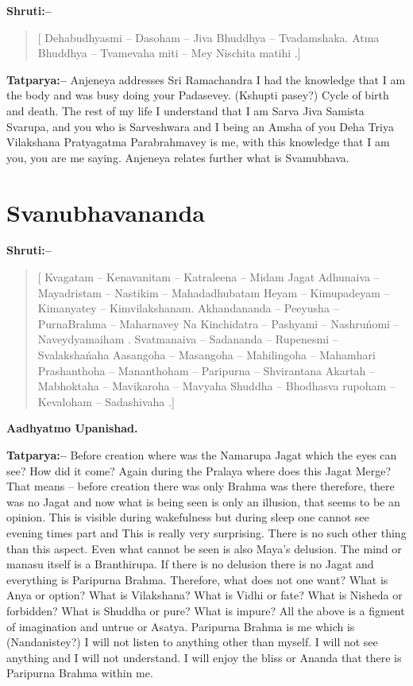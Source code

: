 \textbf{Shruti:–}

\begin{verse}
[ Dehabudhyasmi – Dasoham – Jiva Bhuddhya – Tvadamshaka.  Atma Bhuddhya – Tvamevaha miti – Mey Nischita matihi .]
\end{verse}

\textbf{Tatparya:–} Anjeneya addresses Sri Ramachandra I had the knowledge that I am the body and was busy doing your Padasevey. (Kshupti pasey?) Cycle of birth and death. The rest of my life I understand that I am Sarva Jiva Samista Svarupa, and you who is Sarveshwara and I being an Amsha of you Deha Triya Vilakshana Pratyagatma Parabrahmavey is me, with this knowledge that I am you, you are me saying. Anjeneya relates further what is Svamubhava.

\chapter{Svanubhavananda}

\textbf{Shruti:–}

\begin{verse}
[ Kvagatam – Kenavanitam – Katraleena – Midam Jagat  Adhunaiva – Mayadristam – Nastikim – Mahadadhubatam  Heyam – Kimupadeyam – Kimanyatey – Kimvilakshanam.  Akhandananda – Peeyusha – PurnaBrahma – Maharnavey  Na Kinchidatra – Pashyami – Nashruńomi – Naveydyamaiham . Svatmanaiva – Sadananda – Rupenesmi – Svalakshańaha  Aasangoha – Masangoha – Mahilingoha – Mahamhari  Prashanthoha – Mananthoham – Paripurna – Shvirantana  Akartah – Mabhoktaha – Mavikaroha – Mavyaha  Shuddha – Bhodhasva rupoham – Kevaloham – Sadashivaha .]
\end{verse}

\begin{flushright}
\textbf{Aadhyatmo Upanishad.}
\end{flushright}

\textbf{Tatparya:–} Before creation where was the Namarupa Jagat which the eyes can see? How did it come? Again during the Pralaya where does this Jagat Merge? That means – before creation there was only Brahma was there therefore, there was no Jagat and now what is being seen is only an illusion, that seems to be an opinion. This is visible during wakefulness but during sleep one cannot see evening times part and This is really very surprising. There is no such other thing than this aspect. Even what cannot be seen is also Maya's delusion. The mind or manasu itself is a Branthirupa. If there is no delusion there is no Jagat and everything is Paripurna Brahma. Therefore, what does not one want? What is Anya or option? What is Vilakshana? What is Vidhi or fate? What is Nisheda or forbidden? What is Shuddha or pure? What is impure? All the above is a figment of imagination and untrue or Asatya. Paripurna Brahma is me which is (Nandanistey?) I will not listen to anything other than myself. I will not see anything and I will not understand. I will enjoy the bliss or Ananda that there is Paripurna Brahma within me.

